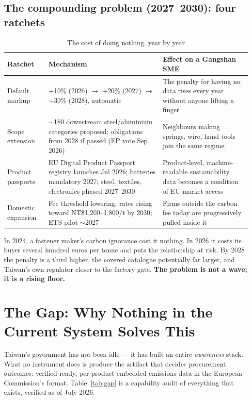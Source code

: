 \subsection{The compounding problem (2027--2030): four ratchets}

\begin{table}[htbp]
\caption{The cost of doing nothing, year by year}
\label{tab:ratchets}
\small
\begin{tabularx}{\textwidth}{@{}p{}Xp{}@{}}
\toprule
\textbf{Ratchet} & \textbf{Mechanism} & \textbf{Effect on a Gangshan SME} \\
\midrule
Default markup & +10\% (2026) $\to$ +20\% (2027) $\to$ +30\% (2028), automatic\cite{omm} & The penalty for having no data rises every year without anyone lifting a finger \\
Scope extension & $\sim$180 downstream steel/aluminium categories proposed; obligations from 2028 if passed (EP vote Sep 2026)\cite{akin} & Neighbours making springs, wire, hand tools join the same regime \\
Product passports & EU Digital Product Passport registry launches Jul 2026; batteries mandatory 2027; steel, textiles, electronics phased 2027--2030\cite{espr} & Product-level, machine-readable sustainability data becomes a condition of EU market access \\
Domestic expansion & Fee threshold lowering; rates rising toward NT\$1,200--1,800/t by 2030; ETS pilot $\sim$2027\cite{ecobiz} & Firms outside the carbon fee today are progressively pulled inside it \\
\bottomrule
\end{tabularx}
\end{table}

In 2024, a fastener maker's carbon ignorance cost it nothing. In 2026 it costs
its buyer several hundred euros per tonne and puts the relationship at risk. By
2028 the penalty is a third higher, the covered catalogue potentially far
larger, and Taiwan's own regulator closer to the factory gate. \textbf{The
problem is not a wave; it is a rising floor.}

\section{The Gap: Why Nothing in the Current System Solves This}\label{sec:gap}

Taiwan's government has not been idle --- it has built an entire
\emph{awareness} stack. What no instrument does is produce the artifact that
decides procurement outcomes: verified-ready, per-product embedded-emissions
data in the European Commission's format. Table~\ref{tab:gap} is a capability
audit of everything that exists, verified as of July 2026.

